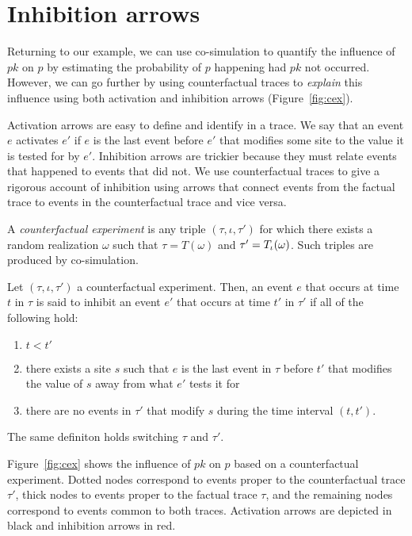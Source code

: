 \section{Inhibition arrows}\label{sec:inhibition}

Returning to our example, we can use co-simulation to quantify the
influence of $pk$ on $p$ by estimating the probability of $p$
happening had $pk$ not occurred. However, we can go further by using
counterfactual traces to \textit{explain} this influence using both
activation and inhibition arrows (Figure~\ref{fig:cex}).

Activation arrows are easy to define and identify in a trace. We say
that an event $e$ activates $e'$ if $e$ is the last event before $e'$
that modifies some site to the value it is tested for by
$e'$. Inhibition arrows are trickier because they must relate events
that happened to events that did not. We use counterfactual traces to
give a rigorous account of inhibition using arrows that connect events
from the factual trace to events in the counterfactual trace and vice
versa.

A \textit{counterfactual experiment} is any triple
$(\tau, \iota, \tau')$ for which there exists a random realization
$\omega$ such that $\tau = T(\omega)$ and $\tau' =
{T_\iota}{}(\omega)$. Such triples are produced by co-simulation.


\begin{definition}
  Let $(\tau, \iota, \tau')$ a counterfactual experiment.  Then, an
  event $e$ that occurs at time $t$ in $\tau$ is said to inhibit an
  event $e'$ that occurs at time $t'$ in $\tau'$ if all of the
  following hold:
  \begin{enumerate}[leftmargin=1.2cm, label=\textbf{IC\arabic*.}]
  \item \label{inhibition:time} $t < t'$
  \item \label{inhibition:breaks} there exists a site $s$ such that
    $e$ is the last event in $\tau$ before $t'$ that modifies the
    value of $s$ away from what $e'$ tests it for
  \item \label{inhibition:nointf} there are no events in $\tau'$ that
    modify $s$ during the time interval $(t, t')$.
  \end{enumerate}
  The same definiton holds switching $\tau$ and $\tau'$.
\end{definition}





Figure~\ref{fig:cex} shows the influence of $pk$ on $p$ based on a
counterfactual experiment. Dotted nodes correspond to events proper to
the counterfactual trace $\tau'$, thick nodes to events proper to the
factual trace $\tau$, and the remaining nodes correspond to events
common to both traces. Activation arrows are depicted in black and
inhibition arrows in red.

